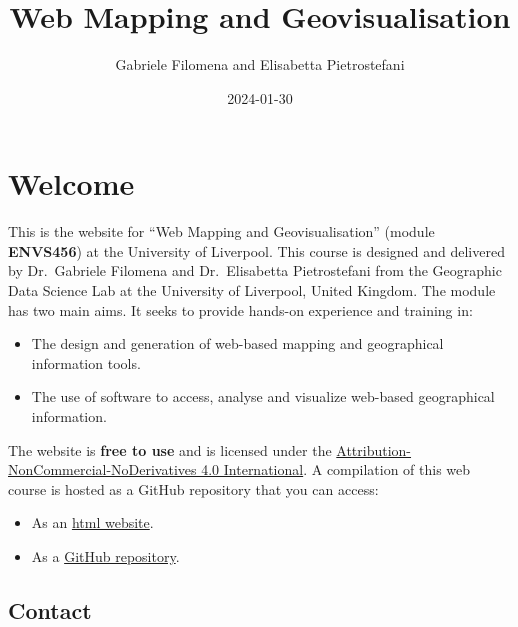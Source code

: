 \documentclass[
  letterpaper,
  DIV=11,
  numbers=noendperiod]{scrreprt}
\title{Web Mapping and Geovisualisation}
\author{Gabriele Filomena and Elisabetta Pietrostefani}
\date{2024-01-30}
\providecommand{\tightlist}{%
  \setlength{\itemsep}{0pt}\setlength{\parskip}{0pt}}\usepackage{longtable,booktabs,array}
\renewcommand*\contentsname{Table of contents}
\newcommand\contentsname{Table of contents}
\begin{document}
\maketitle

\renewcommand*\contentsname{Table of contents}
{
\hypersetup{linkcolor=}
\setcounter{tocdepth}{2}
\tableofcontents
}

\chapter*{Welcome}\label{welcome}


This is the website for ``Web Mapping and Geovisualisation'' (module
\textbf{ENVS456}) at the University of Liverpool. This course is
designed and delivered by Dr.~Gabriele Filomena and Dr.~Elisabetta
Pietrostefani from the Geographic Data Science Lab at the University of
Liverpool, United Kingdom. The module has two main aims. It seeks to
provide hands-on experience and training in:

\begin{itemize}
\tightlist
\item
  The design and generation of web-based mapping and geographical
  information tools.
\item
  The use of software to access, analyse and visualize web-based
  geographical information.
\end{itemize}

The website is \textbf{free to use} and is licensed under the
\href{https://creativecommons.org/licenses/by-nc-nd/4.0/}{Attribution-NonCommercial-NoDerivatives
4.0 International}. A compilation of this web course is hosted as a
GitHub repository that you can access:

\begin{itemize}
\tightlist
\item
  As an \href{https://gdsl-ul.github.io/wma}{html website}.
\item
  As a \href{https://github.com/GDSL-UL/wma}{GitHub repository}.
\end{itemize}

\section*{Contact}\label{contact}

\end{document}

